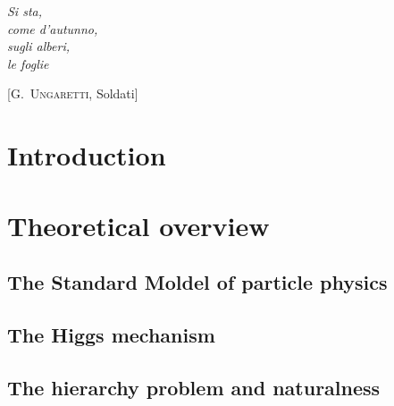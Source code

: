 \documentclass[10pt,twoside,cucitura,classica,english,openany]{toptesi}
\begin{document}




\english

\cleardoublepage

\frontespizio
\paginavuota
\begin{dedica}
\end{dedica}

\ringraziamenti

\tablespagetrue\figurespagetrue \indici

\begin{citazioni}
  \textit{Si sta,\\come d'autunno,\\sugli alberi,\\le foglie }

  [\textsc{G.~Ungaretti}, Soldati]
\end{citazioni}


\chapter*{Introduction}
\label{cha:intro}


\mainmatter

\chapter{Theoretical overview}
\label{cha:theoretical-overview}

\section{The Standard Moldel of particle physics}
\label{sec:stand-mold-part}



\section{The Higgs mechanism}
\label{sec:higgs-mechanism}



\section{The hierarchy problem and naturalness}
\label{sec:hier-probl-natur}
\end{document}
